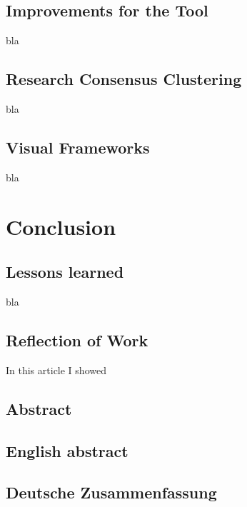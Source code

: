 \documentclass[
	a4paper,
	english,
	twoside,
	openright,               
	11pt                            
	]{report}
\begin{document}
\section{Improvements for the Tool}

bla

\section{Research Consensus Clustering}

bla

\section{Visual Frameworks}

bla


\chapter{Conclusion}\label{cha:conclusion}

\section{Lessons learned}
bla 

\section{Reflection of Work}
In this article I showed 

\begin{appendices}

\chapter{Abstract} %
\label{cha:abstract}

\section{English abstract} %
\label{sec:english_abstract}



\newpage

\section{Deutsche Zusammenfassung} %
\label{sec:deutsche_zusammenfassung}








% 
% 
% 

\end{appendices}

\cleardoublepage

 



\printglossaries
\end{document}
